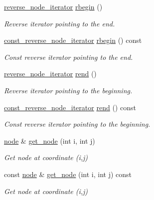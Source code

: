 \begin{DoxyCompactItemize}
\hyperlink{classlb_1_1lattice_a8f14fa67ef5e16926d41569949aaf419}{reverse\-\_\-node\-\_\-iterator} \hyperlink{classlb_1_1lattice_a641c8633f07e24dec22b5abf7740ccd0}{rbegin} ()
\begin{DoxyCompactList}\small\item\em \-Reverse iterator pointing to the end. \end{DoxyCompactList}\item 
\hyperlink{classlb_1_1lattice_abe55fc29d14a9a380106ea7a138e1931}{const\-\_\-reverse\-\_\-node\-\_\-iterator} \hyperlink{classlb_1_1lattice_afb5223f2e802a147640c2431791352bb}{rbegin} () const 
\begin{DoxyCompactList}\small\item\em \-Const reverse iterator pointing to the end. \end{DoxyCompactList}\item 
\hyperlink{classlb_1_1lattice_a8f14fa67ef5e16926d41569949aaf419}{reverse\-\_\-node\-\_\-iterator} \hyperlink{classlb_1_1lattice_aa00f0a64dd19f426ee69f5446d59a21d}{rend} ()
\begin{DoxyCompactList}\small\item\em \-Reverse iterator pointing to the beginning. \end{DoxyCompactList}\item 
\hyperlink{classlb_1_1lattice_abe55fc29d14a9a380106ea7a138e1931}{const\-\_\-reverse\-\_\-node\-\_\-iterator} \hyperlink{classlb_1_1lattice_aa42e54be3a4ac0b93a7699cdfa23a5da}{rend} () const 
\begin{DoxyCompactList}\small\item\em \-Const reverse iterator pointing to the beginning. \end{DoxyCompactList}\item 
\hyperlink{structlb_1_1node}{node} \& \hyperlink{classlb_1_1lattice_a6aefdc7f46963a340fff621c085f6f2c}{get\-\_\-node} (int i, int j)
\begin{DoxyCompactList}\small\item\em \-Get node at coordinate (i,j) \end{DoxyCompactList}\item 
const \hyperlink{structlb_1_1node}{node} \& \hyperlink{classlb_1_1lattice_afdc542f324d410cf29508cd221a3944f}{get\-\_\-node} (int i, int j) const 
\begin{DoxyCompactList}\small\item\em \-Get node at coordinate (i,j) \end{DoxyCompactList}\item 

\end{DoxyCompactItemize}
